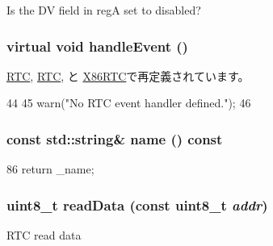 Is the DV field in regA set to disabled? \hypertarget{classMC146818_a30dfd044b822d58a6ff7335f815af8b1}{
\subsubsection[{handleEvent}]{\setlength{\rightskip}{0pt plus 5cm}virtual void handleEvent ()}}
\label{classMC146818_a30dfd044b822d58a6ff7335f815af8b1}


\hyperlink{classTsunamiIO_1_1RTC_af592dd6aaf1c9c6af780a5cbc531417e}{RTC}, \hyperlink{classMaltaIO_1_1RTC_af592dd6aaf1c9c6af780a5cbc531417e}{RTC}, と \hyperlink{classX86ISA_1_1Cmos_1_1X86RTC_af592dd6aaf1c9c6af780a5cbc531417e}{X86RTC}で再定義されています。


\begin{DoxyCode}
44     {
45         warn("No RTC event handler defined.\n");
46     }
\end{DoxyCode}
\hypertarget{classMC146818_a324e8c54c4c5161913681a1a52fef959}{
\subsubsection[{name}]{\setlength{\rightskip}{0pt plus 5cm}const std::string\& name () const}}
\label{classMC146818_a324e8c54c4c5161913681a1a52fef959}



\begin{DoxyCode}
86 { return _name; }
\end{DoxyCode}
\hypertarget{classMC146818_a7190f8b918c6a32feff80f288faa50c2}{
\subsubsection[{readData}]{\setlength{\rightskip}{0pt plus 5cm}uint8\_\-t readData (const uint8\_\-t {\em addr})}}
\label{classMC146818_a7190f8b918c6a32feff80f288faa50c2}
RTC read data 


